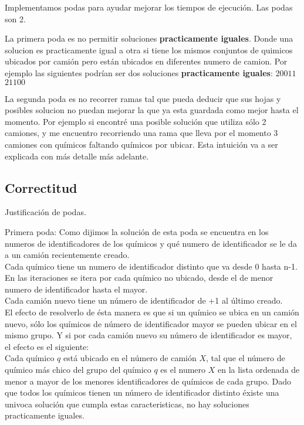 \noindent
Implementamos podas para ayudar mejorar los tiempos de ejecuci\'on. Las podas son 2. 

\noindent
La primera poda es no permitir soluciones \textbf{practicamente iguales}. Donde una solucion es practicamente igual a otra si tiene los mismos conjuntos de quimicos ubicados por cami\'on pero est\'an ubicados en diferentes numero de camion. Por ejemplo las siguientes podr\'ian ser dos soluciones \textbf{practicamente iguales}:
$2 0 0 1 1$
$2 1 1 0 0$
 
\noindent
La segunda poda es no recorrer ramas tal que pueda deducir que sus hojas y posibles solucion no puedan mejorar la que ya esta guardada como mejor hasta el momento. Por ejemplo si encontr\'e una posible soluci\'on que utiliza s\'olo 2 camiones, y me encuentro recorriendo una rama que lleva por el momento 3 camiones con qu\'imicos faltando qu\'imicos por ubicar. Esta intuici\'on va a ser explicada con m\'as detalle m\'as adelante.


\subsection{Correctitud}

\noindent
Justificaci\'on de podas.

\noindent
Primera poda: 
Como dijimos la soluci\'on de esta poda se encuentra en los numeros de identificadores de los qu\'imicos y qu\'e numero de identificador se le da a un cami\'on recientemente creado.\\
Cada qu\'imico tiene un numero de identificador distinto que va desde 0 hasta n-1. En las iteraciones se itera por cada qu\'imico no ubicado, desde el de menor numero de identificador hasta el mayor.\\ 
Cada cami\'on nuevo tiene un n\'umero de identificador de +1 al \'ultimo creado. \\
El efecto de resolverlo de \'esta manera es que si un qu\'imico se ubica en un cami\'on nuevo, s\'olo los qu\'imicos de n\'umero de identificador mayor se pueden ubicar en el mismo grupo. Y si por cada cami\'on nuevo su n\'umero de identificador es mayor, el efecto es el siguiente:\\
Cada qu\'imico $q$ est\'a ubicado en el n\'umero de cami\'on $X$, tal que el n\'umero de qu\'imico m\'as chico del grupo del qu\'imico $q$ es el numero $X$ en la lista ordenada de menor a mayor de los menores identificadores de qu\'imicos de cada grupo. Dado que todos los qu\'imicos tienen un n\'umero de identificador distinto \'existe una univoca soluci\'on que cumpla estas caracteristicas, no hay soluciones practicamente iguales.\\

